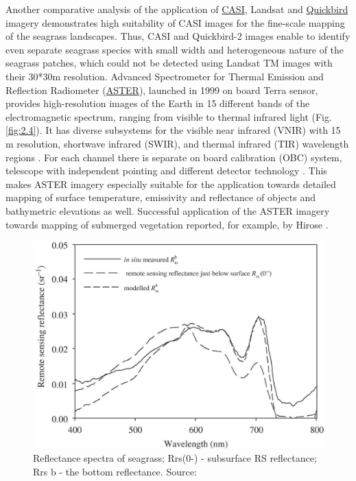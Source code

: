 \documentclass[10pt, a4paper]{article}
\begin{document}
Another comparative analysis of the application of \href{http://www.itres.com/products/imagers/casi550}{CASI}, Landsat and \href{http://www.digitalglobe.com/index.php/85/QuickBird}{Quickbird} imagery \cite{Phinn08}\label{Phinn08}
 demonstrates high suitability of CASI images for the fine-scale mapping of the seagrass
landscapes. Thus, CASI and Quickbird-2 images enable to identify even separate seagrass species
with small width and heterogeneous nature of the seagrass patches, which could not be detected using
Landsat TM images with their 30*30m resolution.
Advanced Spectrometer for Thermal Emission and Reflection Radiometer (\href{http://asterweb.jpl.nasa.gov/}{ASTER}), launched in
1999 on board Terra sensor, provides high-resolution images of the Earth in 15 different bands of the
electromagnetic spectrum, ranging from visible to thermal infrared light  (Fig.\ref{fig:2.4}). It has diverse
subsystems for the visible near infrared (VNIR) with 15 m resolution, shortwave infrared (SWIR), and
thermal infrared (TIR) wavelength regions \cite{Kalinowski04}\label{Kalinowski04}. For each channel there is separate
on board calibration (OBC) system, telescope with independent pointing and different detector technology \cite{Arai05}\label{Arai05}. 
This makes ASTER imagery especially suitable for the application towards detailed
mapping of surface temperature, emissivity and reflectance of objects and bathymetric elevations as
well. Successful application of the ASTER imagery towards mapping of submerged vegetation
reported, for example, by Hirose \cite{Hirose04}\label{Hirose04}. 

\begin{figure}
	\centering
	\includegraphics[scale=0.15]{Fig-15.jpg}
	\caption{Reflectance spectra of seagrass; Rrs(0-) - subsurface RS reflectance; Rrs b - the bottom
		reflectance. Source:\cite{Yang10}\label{Yang10}}
	\label{fig:2.6}
\end{figure}
\end{document}
